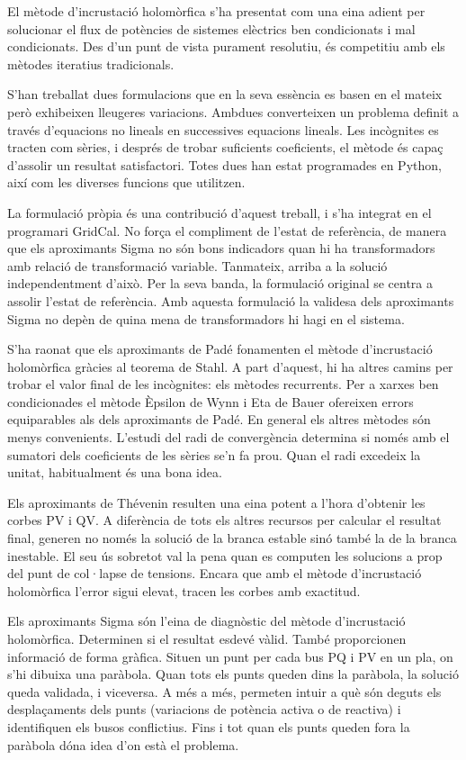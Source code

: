 El mètode d'incrustació holomòrfica s'ha presentat com una eina adient per solucionar el flux de potències de sistemes elèctrics ben condicionats i mal condicionats. Des d'un punt de vista purament resolutiu, és competitiu amb els mètodes iteratius tradicionals. 

S'han treballat dues formulacions que en la seva essència es basen en el mateix però exhibeixen lleugeres variacions. Ambdues converteixen un problema definit a través d'equacions no lineals en successives equacions lineals. Les incògnites es tracten com sèries, i després de trobar suficients coeficients, el mètode és capaç d'assolir un resultat satisfactori. Totes dues han estat programades en Python, així com les diverses funcions que utilitzen.

La formulació pròpia és una contribució d'aquest treball, i s'ha integrat en el programari GridCal. No força el compliment de l'estat de referència, de manera que els aproximants Sigma no són bons indicadors quan hi ha transformadors amb relació de transformació variable. Tanmateix, arriba a la solució independentment d'això. Per la seva banda, la formulació original se centra a assolir l'estat de referència. Amb aquesta formulació la validesa dels aproximants Sigma no depèn de quina mena de transformadors hi hagi en el sistema.

S'ha raonat que els aproximants de Padé fonamenten el mètode d'incrustació holomòrfica gràcies al teorema de Stahl. A part d'aquest, hi ha altres camins per trobar el valor final de les incògnites: els mètodes recurrents. Per a xarxes ben condicionades el mètode Èpsilon de Wynn i Eta de Bauer ofereixen errors equiparables als dels aproximants de Padé. En general els altres mètodes són menys convenients. L'estudi del radi de convergència determina si només amb el sumatori dels coeficients de les sèries se'n fa prou. Quan el radi excedeix la unitat, habitualment és una bona idea. 

Els aproximants de Thévenin resulten una eina potent a l'hora d'obtenir les corbes PV i QV. A diferència de tots els altres recursos per calcular el resultat final, generen no només la solució de la branca estable sinó també la de la branca inestable. El seu ús sobretot val la pena quan es computen les solucions a prop del punt de col·lapse de tensions. Encara que amb el mètode d'incrustació holomòrfica l'error sigui elevat, tracen les corbes amb exactitud.

Els aproximants Sigma són l'eina de diagnòstic del mètode d'incrustació holomòrfica. Determinen si el resultat esdevé vàlid. També proporcionen informació de forma gràfica. Situen un punt per cada bus PQ i PV en un pla, on s'hi dibuixa una paràbola. Quan tots els punts queden dins la paràbola, la solució queda validada, i viceversa. A més a més, permeten intuir a què són deguts els desplaçaments dels punts (variacions de potència activa o de reactiva) i identifiquen els busos conflictius. Fins i tot quan els punts queden fora la paràbola dóna idea d'on està el problema.

